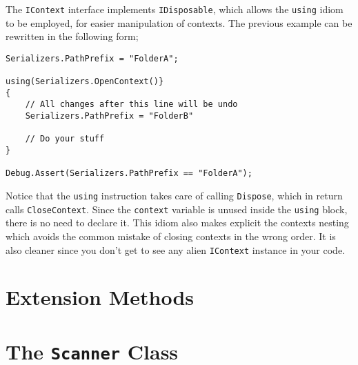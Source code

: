 The \texttt{IContext} interface implements \texttt{IDisposable},
which allows the \texttt{using} idiom to be employed, for
easier manipulation of contexts. The previous example can be
rewritten in the following form;

\begin{verbatim}
Serializers.PathPrefix = "FolderA";

using(Serializers.OpenContext()}
{
    // All changes after this line will be undo
    Serializers.PathPrefix = "FolderB"

    // Do your stuff
}

Debug.Assert(Serializers.PathPrefix == "FolderA");
\end{verbatim}

Notice that the \texttt{using} instruction takes care
of calling \texttt{Dispose}, which in return calls \texttt{CloseContext}.
Since the \texttt{context} variable is unused inside the \texttt{using}
block, there is no need to declare it. This idiom also makes explicit
the contexts nesting which avoids the common mistake of closing contexts
in the wrong order. It is also cleaner since you don't get to see
any alien \texttt{IContext} instance in your code.

\section{Extension Methods}

\section{The \texttt{Scanner} Class}
